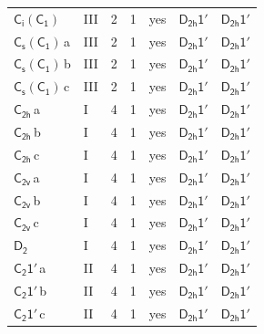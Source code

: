 \documentclass[10pt,a4paper]{article}
\numberwithin{equation}{section}
\newcommand{\grp}[1]{\mathsf{#1}}
\newcommand{\clsletter}[1]{\,{\scriptsize\color{black!55}#1}}
\begin{document}
{\begin{longtable}{@{}llrrlll@{}}
\href{S2-C1.pdf}{$\grp{C_{i}}(\grp{C_{1}})$} & III & 2 & 1 & yes & \href{D2h-1p.pdf}{$\grp{D_{2h}1'}$} & \href{D2h-1p.pdf}{$\grp{D_{2h}1'}$}\\
\href{C1v-C1.pdf}{$\grp{C_{s}}(\grp{C_{1}})$}\clsletter{a} & III & 2 & 1 & yes & \href{D2h-1p.pdf}{$\grp{D_{2h}1'}$} & \href{D2h-1p.pdf}{$\grp{D_{2h}1'}$}\\
\href{C1v-C1.pdf}{$\grp{C_{s}}(\grp{C_{1}})$}\clsletter{b} & III & 2 & 1 & yes & \href{D2h-1p.pdf}{$\grp{D_{2h}1'}$} & \href{D2h-1p.pdf}{$\grp{D_{2h}1'}$}\\
\href{C1v-C1.pdf}{$\grp{C_{s}}(\grp{C_{1}})$}\clsletter{c} & III & 2 & 1 & yes & \href{D2h-1p.pdf}{$\grp{D_{2h}1'}$} & \href{D2h-1p.pdf}{$\grp{D_{2h}1'}$}\\
\href{../../../rotation/data/pdf/C2h.pdf}{$\grp{C_{2h}}$}\clsletter{a} & I & 4 & 1 & yes & \href{D2h-1p.pdf}{$\grp{D_{2h}1'}$} & \href{D2h-1p.pdf}{$\grp{D_{2h}1'}$}\\
\href{../../../rotation/data/pdf/C2h.pdf}{$\grp{C_{2h}}$}\clsletter{b} & I & 4 & 1 & yes & \href{D2h-1p.pdf}{$\grp{D_{2h}1'}$} & \href{D2h-1p.pdf}{$\grp{D_{2h}1'}$}\\
\href{../../../rotation/data/pdf/C2h.pdf}{$\grp{C_{2h}}$}\clsletter{c} & I & 4 & 1 & yes & \href{D2h-1p.pdf}{$\grp{D_{2h}1'}$} & \href{D2h-1p.pdf}{$\grp{D_{2h}1'}$}\\
\href{../../../rotation/data/pdf/C2v.pdf}{$\grp{C_{2v}}$}\clsletter{a} & I & 4 & 1 & yes & \href{D2h-1p.pdf}{$\grp{D_{2h}1'}$} & \href{D2h-1p.pdf}{$\grp{D_{2h}1'}$}\\
\href{../../../rotation/data/pdf/C2v.pdf}{$\grp{C_{2v}}$}\clsletter{b} & I & 4 & 1 & yes & \href{D2h-1p.pdf}{$\grp{D_{2h}1'}$} & \href{D2h-1p.pdf}{$\grp{D_{2h}1'}$}\\
\href{../../../rotation/data/pdf/C2v.pdf}{$\grp{C_{2v}}$}\clsletter{c} & I & 4 & 1 & yes & \href{D2h-1p.pdf}{$\grp{D_{2h}1'}$} & \href{D2h-1p.pdf}{$\grp{D_{2h}1'}$}\\
\href{../../../rotation/data/pdf/D2.pdf}{$\grp{D_{2}}$} & I & 4 & 1 & yes & \href{D2h-1p.pdf}{$\grp{D_{2h}1'}$} & \href{D2h-1p.pdf}{$\grp{D_{2h}1'}$}\\
\href{C2-1p.pdf}{$\grp{C_{2}1'}$}\clsletter{a} & II & 4 & 1 & yes & \href{D2h-1p.pdf}{$\grp{D_{2h}1'}$} & \href{D2h-1p.pdf}{$\grp{D_{2h}1'}$}\\
\href{C2-1p.pdf}{$\grp{C_{2}1'}$}\clsletter{b} & II & 4 & 1 & yes & \href{D2h-1p.pdf}{$\grp{D_{2h}1'}$} & \href{D2h-1p.pdf}{$\grp{D_{2h}1'}$}\\
\href{C2-1p.pdf}{$\grp{C_{2}1'}$}\clsletter{c} & II & 4 & 1 & yes & \href{D2h-1p.pdf}{$\grp{D_{2h}1'}$} & \href{D2h-1p.pdf}{$\grp{D_{2h}1'}$}\\

\end{longtable}}
\end{document}
